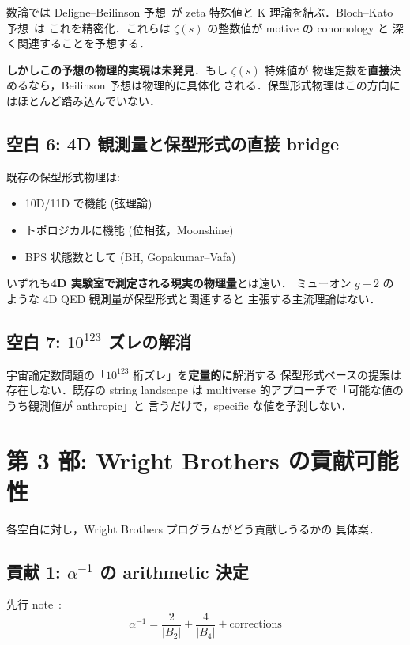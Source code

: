 \documentclass[11pt,a4paper]{article}
\begin{document}
数論では Deligne--Beilinson 予想~\cite{Deligne1979,Beilinson1984}が
zeta 特殊値と K 理論を結ぶ．Bloch--Kato 予想~\cite{BlochKato1990}は
これを精密化．これらは $\zeta(s)$ の整数値が motive の cohomology と
深く関連することを予想する．

\textbf{しかしこの予想の物理的実現は未発見}．もし $\zeta(s)$ 特殊値が
物理定数を\textbf{直接}決めるなら，Beilinson 予想は物理的に具体化
される．保型形式物理はこの方向にはほとんど踏み込んでいない．

\subsection{空白 6: 4D 観測量と保型形式の直接 bridge}

既存の保型形式物理は:
\begin{itemize}
\item 10D/11D で機能 (弦理論)
\item トポロジカルに機能 (位相弦，Moonshine)
\item BPS 状態数として (BH, Gopakumar--Vafa)
\end{itemize}

いずれも\textbf{4D 実験室で測定される現実の物理量}とは遠い．
ミューオン $g-2$ のような 4D QED 観測量が保型形式と関連すると
主張する主流理論はない．

\subsection{空白 7: $10^{123}$ ズレの解消}

宇宙論定数問題の「$10^{123}$ 桁ズレ」を\textbf{定量的に}解消する
保型形式ベースの提案は存在しない．既存の string landscape は
multiverse 的アプローチで「可能な値のうち観測値が anthropic」と
言うだけで，specific な値を予測しない．

\section{第 3 部: Wright Brothers の貢献可能性}

各空白に対し，Wright Brothers プログラムがどう貢献しうるかの
具体案．

\subsection{貢献 1: $\alpha^{-1}$ の arithmetic 決定}

先行 note~\cite{wb-alpha}:
\begin{equation}
\alpha^{-1} = \frac{2}{|B_2|} + \frac{4}{|B_4|} + \text{corrections}
\end{equation}
\end{document}

